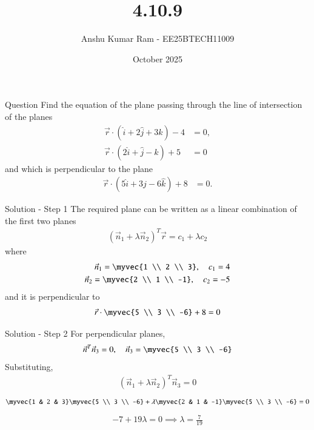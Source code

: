 \documentclass{beamer}
\title{4.10.9}
\date{October 2025}
\author{Anshu Kumar Ram - EE25BTECH11009}
\begin{document}
\frame{\titlepage}

\begin{frame}{Question}
Find the equation of the plane passing through the line of intersection of the planes
\begin{align}
\vec{r} \cdot (\hat{i} + 2\hat{j} + 3\hat{k}) - 4 &= 0,\\
\vec{r} \cdot (2\hat{i} + \hat{j} - \hat{k}) + 5 &= 0
\end{align}
and which is perpendicular to the plane
\begin{align}
\vec{r} \cdot (5\hat{i} + 3\hat{j} - 6\hat{k}) + 8 &= 0.
\end{align}
\end{frame}

\begin{frame}{Solution - Step 1}
The required plane can be written as a linear combination of the first two planes
\begin{align}
(\vec{n}_1 + \lambda\vec{n}_2)^T\vec{r} = c_1 + \lambda c_2
\end{align}
where
\begin{align}
\vec{n}_1 = \myvec{1 \\ 2 \\ 3}, \quad c_1 = 4 \\
\vec{n}_2 = \myvec{2 \\ 1 \\ -1}, \quad c_2 = -5
\end{align}
and it is perpendicular to
\begin{align}
\vec{r}\cdot \myvec{5 \\ 3 \\ -6} + 8 = 0
\end{align}
\end{frame}

\begin{frame}{Solution - Step 2}
For perpendicular planes,
\begin{align}
\vec{n}^T \vec{n}_3 = 0, \quad \vec{n}_3 = \myvec{5 \\ 3 \\ -6}
\end{align}
Substituting,
\begin{align}
(\vec{n}_1 + \lambda\vec{n}_2)^T\vec{n}_3 = 0
\end{align}
\begin{align}
\myvec{1 & 2 & 3}\myvec{5 \\ 3 \\ -6} + \lambda\myvec{2 & 1 & -1}\myvec{5 \\ 3 \\ -6} = 0
\end{align}
\begin{align}
-7 + 19\lambda = 0 \implies \lambda = \frac{7}{19}
\end{align}
\end{frame}
\end{document}
